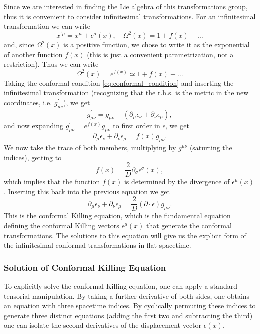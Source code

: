 Since we are interested in finding the Lie algebra of this transformations group, thus it is convenient to consider infinitesimal transformations. For an infinitesimal transformation we can write
\[
    x^{\prime\mu}=x^{\mu}+\epsilon^{\mu}(x), \quad \Omega^{2}(x)=1+f(x)+\dots
\]
and, since \(\Omega^{2}(x)\) is a positive function, we chose to write it as the exponential of another function \(f(x)\) (this is just a convenient parametrization, not a restriction). Thus we can write
\[
    \Omega^{2}(x)=e^{f(x)}\simeq 1+f(x)+\dots
\]
Taking the conformal condition \eqref{eq:conformal_condition} and inserting the infinitesimal transformation (recognizing that the r.h.s. is the metric in the new coordinates, i.e. \(g_{\mu\nu}^{\prime}\)), we get
\[
    g_{\mu\nu}^{\prime}=g_{\mu\nu}-(\partial_{\mu}\epsilon_{\nu}+\partial_{\nu}\epsilon_{\mu}),
\]
and now expanding \(g_{\mu\nu}^{\prime} = e^{f(x)}g_{\mu\nu}\) to first order in \(\epsilon\), we get
\[
    \partial_{\mu}\epsilon_{\nu}+\partial_{\nu}\epsilon_{\mu}=f(x)g_{\mu\nu}.
\]
We now take the trace of both members, multiplying by \(g^{\mu\nu}\) (saturting the indices), getting to
\[
    f(x)=\frac{2}{D}\partial_{\sigma}\epsilon^{\sigma}(x),
\]
which implies that the function \(f(x)\) is determined by the divergence of \(\epsilon^{\mu}(x)\). Inserting this back into the previous equation we get
\begin{equation}
    \partial_{\mu}\epsilon_{\nu}+\partial_{\nu}\epsilon_{\mu}=\frac{2}{D}(\partial \cdot \epsilon)g_{\mu\nu}.
    \label{eq:conformal_killing_equation}
\end{equation}
This is the conformal Killing equation, which is the fundamental equation defining the conformal Killing vectors \(\epsilon^{\mu}(x)\) that generate the conformal transformations. The solutions to this equation will give us the explicit form of the infinitesimal conformal transformations in flat spacetime.

\subsubsection{Solution of Conformal Killing Equation}
To explicitly solve the conformal Killing equation, one can apply a standard tensorial manipulation. By taking a further derivative of both sides, one obtains an equation with three spacetime indices. By cyclically permuting these indices to generate three distinct equations (adding the first two and subtracting the third) one can isolate the second derivatives of the displacement vector \(\epsilon(x)\).


